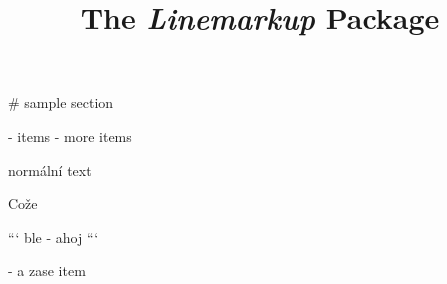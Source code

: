 \documentclass{article}
\begin{document}
\title{The \textit{Linemarkup} Package}

# sample section

- items 
- more items

\bgroup
\noindent normální text
\egroup

Cože

```
ble
- ahoj
```

- a zase item
\end{document}
